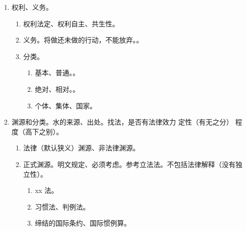 \begin{enumerate}
\begin{enumerate}
\begin{enumerate}
\begin{enumerate}
                          \item 适用方法上。规则 \yjt 全有、全无（互斥关系）。原则 \yjt 兼顾。。
                          \item 最佳化命令（最好的处理效果）。法律规则是确定性命令。
                        \end{enumerate}
                  \item 适用条件。尽可能限制自由裁量。
                        \begin{enumerate}
                          \item 穷尽规则用原则。
                          \item 原则取代规则 = 个案正义 + 更强理由/充分论证。。
                        \end{enumerate}
                \end{enumerate}
        \end{enumerate}
  \item 权利、义务。
        \begin{enumerate}
          \item 权利法定、权利自主、共生性。
          \item 义务。将做还未做的行动，不能放弃。。
          \item 分类。
                \begin{enumerate}
                  \item 基本、普通。。
                  \item 绝对、相对。。
                  \item 个体、集体、国家。
                \end{enumerate}
        \end{enumerate}
  \item 渊源和分类。水的来源、出处。找法，是否有法律效力 \yjt 定性（有无之分） \yjt 程度（高下之别）。
        \begin{enumerate}
          \item 法律（默认狭义）渊源、非法律渊源。
          \item 正式渊源。明文规定、必须考虑。参考立法法。不包括法律解释（没有独立性）。
                \begin{enumerate}
                  \item xx 法。
                  \item 习惯法、判例法。
                  \item 缔结的国际条约、国际惯例算。
                \end{enumerate}

\end{enumerate}
\end{enumerate}
